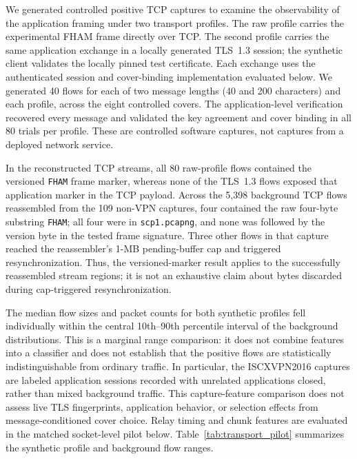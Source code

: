 \documentclass[preprint,12pt]{elsarticle}
\theoremstyle{plain}
\begin{document}
We generated controlled positive TCP captures to examine the observability of
the application framing under two transport profiles. The raw profile carries
the experimental FHAM frame directly over TCP. The second profile carries the
same application exchange in a locally generated TLS~1.3 session; the synthetic
client validates the locally pinned test certificate. Each exchange uses the
authenticated session and cover-binding implementation evaluated below. We
generated 40 flows for each of two message lengths (40 and 200 characters) and
each profile, across the eight controlled covers. The application-level
verification recovered every message and validated the key agreement and
cover binding in all 80 trials per profile. These are controlled software
captures, not captures from a deployed network service.

In the reconstructed TCP streams, all 80 raw-profile flows contained the
versioned \texttt{FHAM} frame marker, whereas none of the TLS~1.3 flows exposed
that application marker in the TCP payload. Across the 5,398 background TCP
flows reassembled from the 109 non-VPN captures, four contained the raw
four-byte substring \texttt{FHAM}; all four were in \texttt{scp1.pcapng}, and
none was followed by the version byte in the tested frame signature. Three
other flows in that capture reached the reassembler's 1-MB pending-buffer cap
and triggered resynchronization. Thus, the versioned-marker result applies to
the successfully reassembled stream regions; it is not an exhaustive claim
about bytes discarded during cap-triggered resynchronization.

The median flow sizes and packet counts for both synthetic profiles fell
individually within the central 10th--90th percentile interval of the
background distributions. This is a marginal range comparison: it does not
combine features into a classifier and does not establish that the positive
flows are statistically indistinguishable from ordinary traffic. In
particular, the ISCXVPN2016 captures are labeled application sessions recorded
with unrelated applications closed, rather than mixed background traffic.
This capture-feature comparison does not assess live TLS fingerprints,
application behavior, or selection effects from message-conditioned cover
choice. Relay timing and chunk features are evaluated in the matched
socket-level pilot below. Table~\ref{tab:transport_pilot} summarizes the
synthetic profile and background flow ranges.

\begin{table}[H]
\centering
\small
\caption{Synthetic positive-flow transport pilot and marginal comparison with reassembled non-VPN TCP flows.}
\label{tab:transport_pilot}

\end{table}
\end{document}
